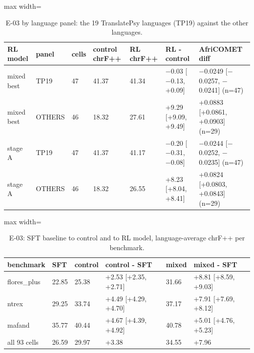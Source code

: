 \begin{table}[t]
\centering\footnotesize
\setlength{\tabcolsep}{4pt}
\caption{E-03 by language panel: the 19 TranslatePsy languages (TP19) against the other languages.}\label{tab:e03-panels}
\begin{adjustbox}{max width=\linewidth}\begin{tabular}{@{}lllllll@{}}
\toprule
RL model & panel & cells & control chrF++ & RL chrF++ & RL - control & AfriCOMET diff \\
\midrule
mixed best & TP19 & 47 & 41.37 & 41.34 & \ensuremath{-}0.03 [\ensuremath{-}0.13, +0.09] & \ensuremath{-}0.0249 [\ensuremath{-}0.0257, \ensuremath{-}0.0241] (n=47) \\
mixed best & OTHERS & 46 & 18.32 & 27.61 & +9.29 [+9.09, +9.49] & +0.0883 [+0.0861, +0.0903] (n=29) \\
stage A & TP19 & 47 & 41.37 & 41.17 & \ensuremath{-}0.20 [\ensuremath{-}0.31, \ensuremath{-}0.08] & \ensuremath{-}0.0244 [\ensuremath{-}0.0252, \ensuremath{-}0.0235] (n=47) \\
stage A & OTHERS & 46 & 18.32 & 26.55 & +8.23 [+8.04, +8.41] & +0.0824 [+0.0803, +0.0843] (n=29) \\
\bottomrule
\end{tabular}\end{adjustbox}
\end{table}

\begin{table}[t]
\centering\footnotesize
\setlength{\tabcolsep}{4pt}
\caption{E-03: SFT baseline to control and to RL model, language-average chrF++ per benchmark.}\label{tab:e03-sft-ctl-rl}
\begin{adjustbox}{max width=\linewidth}\begin{tabular}{@{}llllll@{}}
\toprule
benchmark & SFT & control & control - SFT & mixed & mixed - SFT \\
\midrule
flores\_plus & 22.85 & 25.38 & +2.53 [+2.35, +2.71] & 31.66 & +8.81 [+8.59, +9.03] \\
ntrex & 29.25 & 33.74 & +4.49 [+4.29, +4.70] & 37.17 & +7.91 [+7.69, +8.12] \\
mafand & 35.77 & 40.44 & +4.67 [+4.39, +4.92] & 40.78 & +5.01 [+4.76, +5.23] \\
all 93 cells & 26.59 & 29.97 & +3.38 & 34.55 & +7.96 \\
\bottomrule
\end{tabular}\end{adjustbox}
\end{table}

